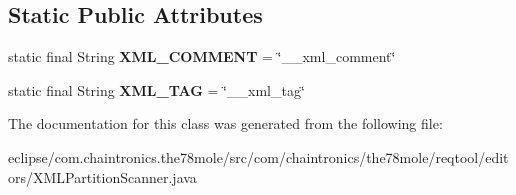 \subsection*{Static Public Attributes}
\begin{DoxyCompactItemize}
\item 
static final String {\bfseries X\+M\+L\+\_\+\+C\+O\+M\+M\+E\+NT} = \char`\"{}\+\_\+\+\_\+xml\+\_\+comment\char`\"{}\hypertarget{classcom_1_1chaintronics_1_1the78mole_1_1reqtool_1_1editors_1_1XMLPartitionScanner_ab5061d96e170e14e8b6362082283d420}{}\label{classcom_1_1chaintronics_1_1the78mole_1_1reqtool_1_1editors_1_1XMLPartitionScanner_ab5061d96e170e14e8b6362082283d420}

\item 
static final String {\bfseries X\+M\+L\+\_\+\+T\+AG} = \char`\"{}\+\_\+\+\_\+xml\+\_\+tag\char`\"{}\hypertarget{classcom_1_1chaintronics_1_1the78mole_1_1reqtool_1_1editors_1_1XMLPartitionScanner_a05ddc0472e93522dbc86424d0c61e65a}{}\label{classcom_1_1chaintronics_1_1the78mole_1_1reqtool_1_1editors_1_1XMLPartitionScanner_a05ddc0472e93522dbc86424d0c61e65a}

\end{DoxyCompactItemize}


The documentation for this class was generated from the following file\+:\begin{DoxyCompactItemize}
\item 
eclipse/com.\+chaintronics.\+the78mole/src/com/chaintronics/the78mole/reqtool/editors/X\+M\+L\+Partition\+Scanner.\+java\end{DoxyCompactItemize}
